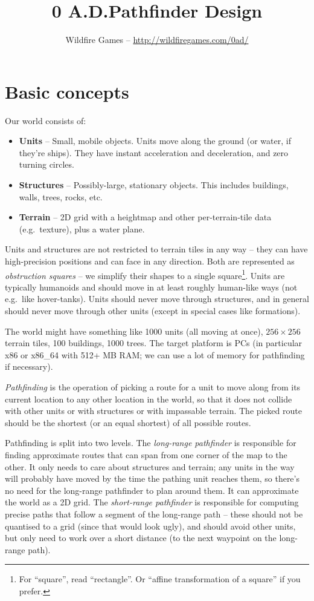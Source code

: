 \documentclass[a4paper,10pt]{article}
\title{0 A.D.\@ Pathfinder Design}
\author{Wildfire Games -- \url{http://wildfiregames.com/0ad/}}
\begin{document}
\maketitle

\tableofcontents

\section{Basic concepts}

Our world consists of:
\begin{itemize}
 \item \textbf{Units} --
  Small, mobile objects.
  Units move along the ground (or water, if they're ships).
  They have instant acceleration and deceleration, and zero turning circles.
 \item \textbf{Structures} --
  Possibly-large, stationary objects.
  This includes buildings, walls, trees, rocks, etc.
 \item \textbf{Terrain} --
  2D grid with a heightmap and other per-terrain-tile data (e.g.\ texture),
  plus a water plane.
\end{itemize}

Units and structures are not restricted to terrain tiles in any way --
they can have high-precision positions and can face in any direction.
Both are represented as \emph{obstruction squares} -- we simplify their shapes to
a single square\footnote{For ``square'', read ``rectangle''. Or ``affine transformation of a square'' if you prefer.}.
Units are typically humanoids and should move in at least roughly human-like ways
(not e.g.\ like hover-tanks).
Units should never move through structures,
and in general should never move through other units (except in special cases like formations).

The world might have something like 1000 units (all moving at once),
$256\times256$ terrain tiles, 100 buildings, 1000 trees.
The target platform is PCs (in particular x86 or x86\_64 with 512+ MB RAM;
we can use a lot of memory for pathfinding if necessary).

\emph{Pathfinding} is the operation of picking a route for a unit to move along
from its current location to any other location in the world,
so that it does not collide with other units
or with structures or with impassable terrain.
The picked route should be the shortest (or an equal shortest) of all possible routes.

Pathfinding is split into two levels.
The \emph{long-range pathfinder} is responsible for finding approximate routes
that can span from one corner of the map to the other.
It only needs to care about structures and terrain;
any units in the way will probably have moved by the time the pathing unit reaches them,
so there's no need for the long-range pathfinder to plan around them.
It can approximate the world as a 2D grid.
The \emph{short-range pathfinder} is responsible for computing precise paths
that follow a segment of the long-range path --
these should not be quantised to a grid (since that would look ugly),
and should avoid other units,
but only need to work over a short distance (to the next waypoint on the long-range path).
\end{document}
